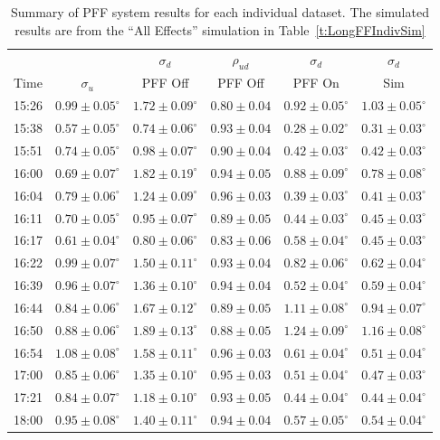 \begin{table}
  \begin{center}
    \begin{tabular}{| c  c  c  c  c  c  |}
	   \hline
	           &   & \(\sigma_d\) & \(\rho_{ud}\)  & \(\sigma_d\)  & \(\sigma_d\)  \\
       Time & \(\sigma_u\) &  PFF Off &  PFF Off &  PFF On &  Sim \\ \hline
15:26 & \(0.99\pm0.05^\circ\) & \(1.72\pm0.09^\circ\) & \(0.80\pm0.04\) & \(0.92\pm0.05^\circ\) & \(1.03\pm0.05^\circ\) \\
15:38 & \(0.57\pm0.05^\circ\) & \(0.74\pm0.06^\circ\) & \(0.93\pm0.04\) & \(0.28\pm0.02^\circ\) & \(0.31\pm0.03^\circ\) \\
15:51 & \(0.74\pm0.05^\circ\) & \(0.98\pm0.07^\circ\) & \(0.90\pm0.04\) & \(0.42\pm0.03^\circ\) & \(0.42\pm0.03^\circ\) \\
16:00 & \(0.69\pm0.07^\circ\) & \(1.82\pm0.19^\circ\) & \(0.94\pm0.05\) & \(0.88\pm0.09^\circ\) & \(0.78\pm0.08^\circ\) \\
16:04 & \(0.79\pm0.06^\circ\) & \(1.24\pm0.09^\circ\) & \(0.96\pm0.03\) & \(0.39\pm0.03^\circ\) & \(0.41\pm0.03^\circ\) \\
16:11 & \(0.70\pm0.05^\circ\) & \(0.95\pm0.07^\circ\) & \(0.89\pm0.05\) & \(0.44\pm0.03^\circ\) & \(0.45\pm0.03^\circ\) \\
16:17 & \(0.61\pm0.04^\circ\) & \(0.80\pm0.06^\circ\) & \(0.83\pm0.06\) & \(0.58\pm0.04^\circ\) & \(0.45\pm0.03^\circ\) \\
16:22 & \(0.99\pm0.07^\circ\) & \(1.50\pm0.11^\circ\) & \(0.93\pm0.04\) & \(0.82\pm0.06^\circ\) & \(0.62\pm0.04^\circ\) \\
16:39 & \(0.96\pm0.07^\circ\) & \(1.36\pm0.10^\circ\) & \(0.94\pm0.04\) & \(0.52\pm0.04^\circ\) & \(0.59\pm0.04^\circ\) \\
16:44 & \(0.84\pm0.06^\circ\) & \(1.67\pm0.12^\circ\) & \(0.89\pm0.05\) & \(1.11\pm0.08^\circ\) & \(0.94\pm0.07^\circ\) \\
16:50 & \(0.88\pm0.06^\circ\) & \(1.89\pm0.13^\circ\) & \(0.88\pm0.05\) & \(1.24\pm0.09^\circ\) & \(1.16\pm0.08^\circ\) \\
16:54 & \(1.08\pm0.08^\circ\) & \(1.58\pm0.11^\circ\) & \(0.96\pm0.03\) & \(0.61\pm0.04^\circ\) & \(0.51\pm0.04^\circ\) \\
17:00 & \(0.85\pm0.06^\circ\) & \(1.35\pm0.10^\circ\) & \(0.95\pm0.03\) & \(0.51\pm0.04^\circ\) & \(0.47\pm0.03^\circ\) \\
17:21 & \(0.84\pm0.07^\circ\) & \(1.18\pm0.10^\circ\) & \(0.93\pm0.05\) & \(0.44\pm0.04^\circ\) & \(0.44\pm0.04^\circ\) \\
18:00 & \(0.95\pm0.08^\circ\) & \(1.40\pm0.11^\circ\) & \(0.94\pm0.04\) & \(0.57\pm0.05^\circ\) & \(0.54\pm0.04^\circ\) \\ \hline
    \end{tabular}
    \caption{Summary of PFF system results for each individual dataset. The simulated results are from the ``All Effects'' simulation in Table~\ref{t:LongFFIndivSim}}
  	\label{t:LongFFIndiv}
  \end{center}
\end{table}

